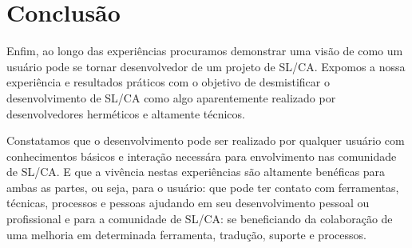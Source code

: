 % 
% 
% 
% 

\section{Conclusão} \label{sec:conclusao}

Enfim, ao longo das experiências procuramos demonstrar uma visão de como um usuário pode se tornar desenvolvedor de um projeto de SL/CA. Expomos a nossa experiência e resultados práticos com o objetivo de desmistificar o desenvolvimento de SL/CA como algo aparentemente realizado por desenvolvedores herméticos e altamente técnicos.

Constatamos que o desenvolvimento pode ser realizado por qualquer usuário com conhecimentos básicos e interação necessára para envolvimento nas comunidade de SL/CA. E que a vivência nestas experiências são altamente benéficas para ambas as partes, ou seja, para o usuário: que pode ter contato com ferramentas, técnicas, processos e pessoas ajudando em seu desenvolvimento pessoal ou profissional e para a comunidade de SL/CA: se beneficiando da colaboração de uma melhoria em determinada ferramenta, tradução, suporte e processos.

